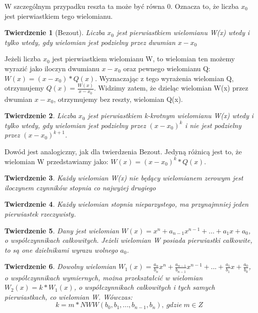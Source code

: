 \documentclass[twoside,a4paper]{book}
\newtheorem{theorem}{Twierdzenie}
\newenvironment{proof}[1][Dowód]{\begin{trivlist}
\item[\hskip \labelsep {\bfseries #1}]}{\end{trivlist}}
\begin{document}
W szczególnym przypadku reszta ta może być równa 0. Oznacza to, że liczba $x_0$ jest pierwiastkiem tego wielomianu.

\begin{theorem}[Bezout]
	Liczba $x_0$ jest pierwiastkiem wielomianu W(x) wtedy i tylko wtedy, gdy wielomian jest podzielny przez dwumian $x - x_0$
\end{theorem}

\begin{proof}
	Jeżeli liczba $x_0$ jest pierwiastkiem wielomianu W, to wielomian ten możemy wyrazić jako iloczyn dwumianu $x - x_0$ oraz pewnego wielomianu Q: $W(x) = (x-x_0) * Q(x)$. Wyznaczając z tego wyrażenia wielomian Q, otrzymujemy $Q(x) = \frac{W(x)}{x-x_0}$. Widzimy zatem, że dzieląc wielomian W(x) przez dwumian $x-x_0$, otrzymujemy bez reszty, wielomian Q(x).
\end{proof}

\begin{theorem}
	Liczba $x_0$ jest pierwiastkiem k-krotnym wielomianu W(x) wtedy i tylko wtedy, gdy wielomian jest podzielny przez $(x - x_0)^k$ i nie jest podzielny przez $(x - x_0)^{k+1}$.
\end{theorem}

\begin{proof}
	Dowód jest analogiczny, jak dla twierdzenia Bezout. Jedyną różnicą jest to, że wielomian W przedstawiamy jako: $W(x) = (x-x_0)^k * Q(x)$.
\end{proof}

\begin{theorem}
	Każdy wielomian W(x) nie będący wielomianem zerowym jest iloczynem czynników stopnia co najwyżej drugiego
\end{theorem}

\begin{theorem}
	Każdy wielomian stopnia nieparzystego, ma przynajmniej jeden pierwiastek rzeczywisty.
\end{theorem}

\begin{theorem}
	Dany jest wielomian $W(x) = x^n + a_{n-1}x^{n-1} + ... + a_1x + a_0$, o współczynnikach całkowitych. Jeżeli wielomian W posiada pierwiastki całkowite, to są one dzielnikami wyrazu wolnego $a_0$.
\end{theorem}

\begin{theorem}
	Dowolny wielomian $W_1(x) = \frac{a_n}{b_n}x^n + \frac{a_{n-1}}{b_{n-1}}x^{n-1} + ... + \frac{a_1}{b_1}x + \frac{a_0}{b_0}$, o współczynnikach wymiernych, można przekształcić w wielomian $W_2(x) = k * W_1(x)$, o współczynnikach całkowitych i tych samych pierwiastkach, co wielomian W. Wówczas:
	\begin{equation}
	k = m * NWW(b_0, b_1, ..., b_{n-1}, b_n),\ gdzie\ m\in Z
	\end{equation}
\end{theorem}
\end{document}
